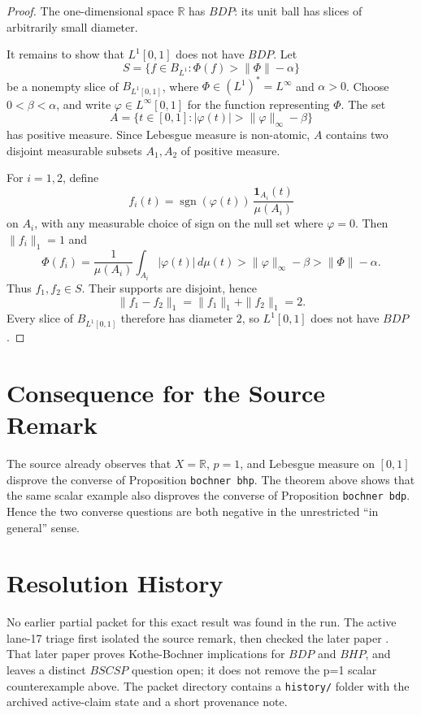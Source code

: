 \documentclass[11pt]{article}
\begin{document}
\begin{proof}
The one-dimensional space \(\mathbb R\) has \(BDP\): its unit ball has slices
of arbitrarily small diameter.

It remains to show that \(L^1[0,1]\) does not have \(BDP\).  Let
\[
  S=\{f\in B_{L^1}:\Phi(f)>\|\Phi\|-\alpha\}
\]
be a nonempty slice of \(B_{L^1[0,1]}\), where \(\Phi\in (L^1)^*=L^\infty\)
and \(\alpha>0\).  Choose \(0<\beta<\alpha\), and write \(\varphi\in
L^\infty[0,1]\) for the function representing \(\Phi\).  The set
\[
  A=\{t\in[0,1]: |\varphi(t)|>\|\varphi\|_\infty-\beta\}
\]
has positive measure.  Since Lebesgue measure is non-atomic, \(A\) contains
two disjoint measurable subsets \(A_1,A_2\) of positive measure.

For \(i=1,2\), define
\[
  f_i(t)=\operatorname{sgn}(\varphi(t))\,\frac{\mathbf 1_{A_i}(t)}{\mu(A_i)}
\]
on \(A_i\), with any measurable choice of sign on the null set where
\(\varphi=0\).  Then \(\|f_i\|_1=1\) and
\[
  \Phi(f_i)=\frac{1}{\mu(A_i)}\int_{A_i}|\varphi(t)|\,d\mu(t)
  > \|\varphi\|_\infty-\beta
  > \|\Phi\|-\alpha.
\]
Thus \(f_1,f_2\in S\).  Their supports are disjoint, hence
\[
  \|f_1-f_2\|_1=\|f_1\|_1+\|f_2\|_1=2.
\]
Every slice of \(B_{L^1[0,1]}\) therefore has diameter \(2\), so
\(L^1[0,1]\) does not have \(BDP\).
\end{proof}

\section*{Consequence for the Source Remark}

The source already observes that \(X=\mathbb R\), \(p=1\), and Lebesgue
measure on \([0,1]\) disprove the converse of Proposition
\texttt{bochner bhp}.  The theorem above shows that the same scalar example
also disproves the converse of Proposition \texttt{bochner bdp}.  Hence the
two converse questions are both negative in the unrestricted ``in general''
sense.

\section*{Resolution History}

No earlier partial packet for this exact result was found in the run.  The
active lane-17 triage first isolated the source remark, then checked the later
paper \cite{BasuSeal2023}.  That later paper proves Kothe-Bochner implications
for \(BDP\) and \(BHP\), and leaves a distinct \(BSCSP\) question open; it
does not remove the p=1 scalar counterexample above.  The packet directory
contains a \texttt{history/} folder with the archived active-claim state and a
short provenance note.
\end{document}
